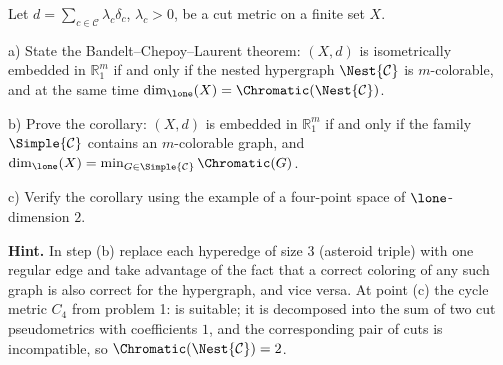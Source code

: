 \documentclass[a4paper,12pt]{report}
\begin{document}
\begin{task}
Let $d=\sum_{c\in\mathcal C}\lambda_c\delta_c$, $\lambda_c>0$, be a cut metric on a finite set $X$.

\textup{a)} State the Bandelt--Chepoy--Laurent theorem\textup{:} $(X,d)$ is isometrically embedded in $\mathbb R^m_1$ if and only if the nested hypergraph $\Nest{\mathcal C}$ is $m$-colorable, and at the same time $\dim_{\lone}(X)=\Chromatic(\Nest{\mathcal C})$.

\textup{b)} Prove the corollary\textup{:} $(X,d)$ is embedded in $\mathbb R^m_1$ if and only if the family $\Simple{\mathcal C}$ contains an $m$-colorable graph, and $\dim_{\lone}(X)=\min_{G\in\Simple{\mathcal C}}\Chromatic(G)$.

\textup{c)} Verify the corollary using the example of a four-point space of $\lone$-dimension $2$.

\textbf{Hint.} In step \textup{(b)} replace each hyperedge of size $3$ (asteroid triple) with one regular edge and take advantage of the fact that a correct coloring of any such graph is also correct for the hypergraph, and vice versa. At point \textup{(c)} the cycle metric $C_4$ from problem \textup{1}\textup{:} is suitable; it is decomposed into the sum of two cut pseudometrics with coefficients $1$, and the corresponding pair of cuts is incompatible, so $\Chromatic(\Nest{\mathcal C})=2$.
\end{task}
\end{document}
